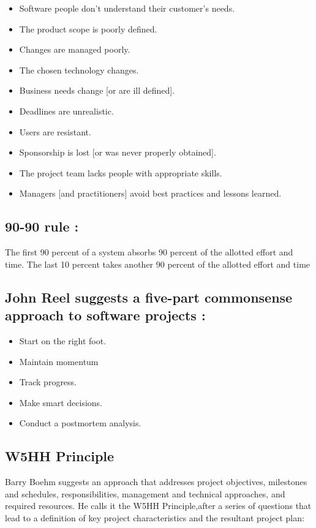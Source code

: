 \documentclass[12pt]{article}
\begin{document}
\begin{itemize}
	\item Software people don’t understand their customer’s needs.
	\item The product scope is poorly defined.
	\item Changes are managed poorly.
	\item The chosen technology changes.
	\item Business needs change [or are ill defined].
	\item Deadlines are unrealistic.
	\item Users are resistant.
	\item Sponsorship is lost [or was never properly obtained].
	\item The project team lacks people with appropriate skills.
	\item Managers [and practitioners] avoid best practices and lessons learned.
\end{itemize}




\subsection{90-90 rule :}

The first 90 percent of a system absorbs 90 percent of the allotted effort and time. The last 10 percent takes another 90 percent of the
allotted effort and time 



\subsection{John Reel suggests a five-part commonsense approach to software projects : }

\begin{itemize}
	\item Start on the right foot.
	\item Maintain momentum
	\item Track progress.
	\item Make smart decisions.
	\item Conduct a postmortem analysis.
\end{itemize}


\subsection{W5HH Principle}

Barry Boehm suggests an approach that addresses project objectives, milestones and schedules, responsibilities, management and
technical approaches, and required resources. He calls it the W5HH Principle,after
a series of questions that lead to a definition of key project characteristics and the
resultant project plan:
\end{document}
